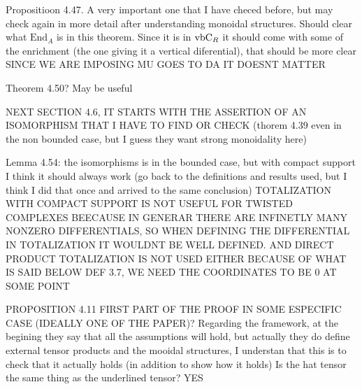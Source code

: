 \documentclass[twoside]{article}
\begin{document}
Propositioon 4.47. A very important one that I have checed before, but may check again in more detail after understanding monoidal structures. Should clear what $\mathrm{End}_A$ is in this theorem. Since it is in $\mathrm{vbC}_R$ it should come with some of the enrichment (the one giving it a vertical diferential), that should be more clear SINCE WE ARE IMPOSING MU GOES TO DA IT DOESNT MATTER

Theorem 4.50? May be useful

NEXT SECTION 4.6, IT STARTS WITH THE ASSERTION OF AN ISOMORPHISM THAT I HAVE TO FIND OR CHECK (thorem 4.39 even in the non bounded case, but I guess they want strong monoidality here)

Lemma 4.54: the isomorphisms is in the bounded case, but with compact support I think it should always work (go back to the definitions and results used, but I think I did that once and arrived to the same conclusion) TOTALIZATION WITH COMPACT SUPPORT IS NOT USEFUL FOR TWISTED COMPLEXES BEECAUSE IN GENERAR  THERE ARE INFINETLY MANY NONZERO DIFFERENTIALS, SO WHEN DEFINING THE DIFFERENTIAL IN TOTALIZATION IT WOULDNT BE WELL DEFINED. AND DIRECT PRODUCT TOTALIZATION IS NOT USED EITHER BECAUSE OF WHAT IS SAID BELOW DEF 3.7, WE NEED THE COORDINATES TO BE 0 AT SOME POINT

PROPOSITION 4.11 FIRST PART OF THE PROOF IN SOME ESPECIFIC CASE (IDEALLY ONE OF THE PAPER)?
Regarding the framework, at the begining they say that all the assumptions will hold, but actually they do define external tensor products and the mooidal structures, I understan that this is to check that it actually holds (in addition to show how it holds) Is the hat tensor the same thing as the underlined tensor? YES
\end{document}

